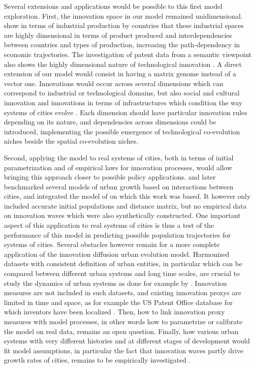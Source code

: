 \documentclass[letterpaper]{article}
\begin{document}
Several extensions and applications would be possible to this first model exploration. First, the innovation space in our model remained unidimensional. \citep{hidalgo2007product} show in terms of industrial production by countries that these industrial spaces are highly dimensional in terms of product produced and interdependencies between countries and types of production, increasing the path-dependency in economic trajectories. The investigation of patent data from a semantic viewpoint also shows the highly dimensional nature of technological innovation \citep{raimbault2016investigating,bergeaud2017classifying}. A direct extension of our model would consist in having a matrix genome instead of a vector one. Innovations would occur across several dimensions which can correspond to industrial or technological domains, but also social and cultural innovation and innovations in terms of infrastructures which condition the way systems of cities evolve \citep{raimbault2018caracterisation}. Each dimension should have particular innovation rules depending on its nature, and dependencies across dimensions could be introduced, implementing the possible emergence of technological co-evolution niches beside the spatial co-evolution niches.

Second, applying the model to real systems of cities, both in terms of initial parametrization and of empirical laws for innovation processes, would allow bringing this approach closer to possible policy applications. \cite{raimbault:halshs-01880492} and later \cite{2020arXiv200510007R} benchmarked several models of urban growth based on interactions between cities, and integrated the model of \cite{favaro2011gibrat} on which this work was based. It however only included accurate initial populations and distance matrix, but no empirical data on innovation waves which were also synthetically constructed. One important aspect of this application to real systems of cities is thus a test of the performance of this model in predicting possible population trajectories for systems of cities. Several obstacles however remain for a more complete application of the innovation diffusion urban evolution model. Harmonized datasets with consistent definition of urban entities, in particular which can be compared between different urban systems and long time scales, are crucial to study the dynamics of urban systems as done for example by \cite{pumain2015multilevel}. Innovation measures are not included in such datasets, and existing innovation proxys are limited in time and space, as for example the US Patent Office database for which inventors have been localized \citep{morrison2017disambiguation}. Then, how to link innovation proxy measures with model processes, in other words how to parametrize or calibrate the model on real data, remains an open question. Finally, how various urban systems with very different histories and at different stages of development would fit model assumptions, in particular the fact that innovation waves partly drive growth rates of cities, remains to be empirically investigated \citep{pumain2009innovation}.
\end{document}
